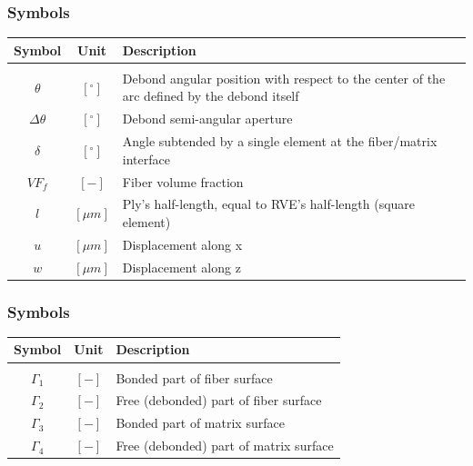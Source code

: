 \documentclass[first,firstsupp,lastsupp,handout,last,hyperref,table]{ETHclass}
\begin{document}
\begin{frame}
\frametitle{\small Symbols}
\vspace{-0.25cm}
\footnotesize
\centering
\captionsetup[figure]{font=scriptsize,labelfont=scriptsize}
\begin{table}[htbp]

  \centering
    \begin{tabularx}{\textwidth}{ccX}
    \textbf{Symbol}&\textbf{Unit} & \textbf{Description} \\[3pt]
    \midrule\\[12pt]
	$\theta$ & $\left[^{\circ}\right]$ & Debond angular position with respect to the center of the arc defined by the debond itself\\[1.5pt]
	$\Delta\theta$ & $\left[^{\circ}\right]$ & Debond semi-angular aperture\\[4pt]
	$\delta$ & $\left[^{\circ}\right]$ & Angle subtended by a single element at the fiber/matrix interface\\[3pt]
	$VF_{f}$ & $\left[-\right]$ & Fiber volume fraction\\[1.5pt]
	$l$ & $\left[\mu m\right]$ & Ply's half-length, equal to RVE's half-length (square element)\\[3pt]
	$u$ & $\left[\mu m\right]$ & Displacement along x\\[1.5pt]
	$w$ & $\left[\mu m\right]$ & Displacement along z\\
    \end{tabularx}%
  \label{tab:phaseprop}%
\end{table}%
\end{frame}

\begin{frame}
\frametitle{\small Symbols}
\vspace{-0.25cm}
\footnotesize
\centering
\captionsetup[figure]{font=scriptsize,labelfont=scriptsize}
\begin{table}[htbp]

  \centering
    \begin{tabularx}{\textwidth}{ccX}
    \textbf{Symbol}&\textbf{Unit} & \textbf{Description} \\[3pt]
    \midrule\\[12pt]
	$\Gamma_{1}$ & $\left[-\right]$ & Bonded part of fiber surface\\[1.5pt]
	$\Gamma_{2}$ & $\left[-\right]$ & Free (debonded) part of fiber surface\\[1.5pt]
	$\Gamma_{3}$ & $\left[-\right]$ & Bonded part of matrix surface\\[1.5pt]
	$\Gamma_{4}$ & $\left[-\right]$ & Free (debonded) part of matrix surface\\[1.5pt]
    \end{tabularx}%
  \label{tab:phaseprop}%
\end{table}%
\end{frame}
\end{document}
